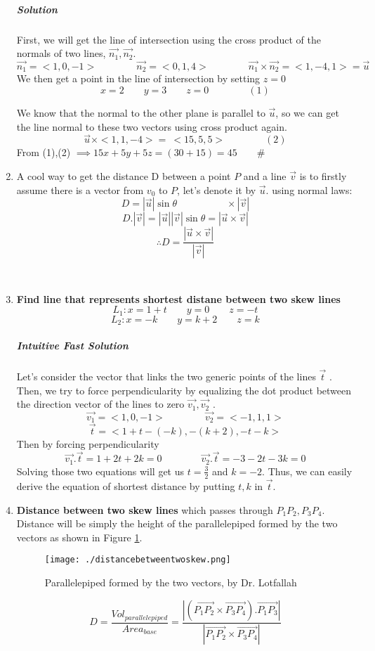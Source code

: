 \documentclass{article}
\begin{document}
\begin{enumerate}[1.]
			\subparagraph{Solution}
			First, we will get the line of intersection using the cross product of the normals of two lines, $ \vec{ n_1}, \vec{ n_2 } $.
			\[
				\vec{ n_1} = <1,0,-1> \qquad \qquad \vec{ n_2 } = <0,1,4> \qquad \qquad \vec{ n_1} \times  \vec{ n_2 } = <1,-4,1> = \vec{ u }
			\]
			We then get a point in the line of intersection by setting $z=0$
			\[
				x=2 \qquad y=3	\qquad z = 0	\qquad \qquad (1)
			\]

			We know that the normal to the other plane is parallel to $ \vec{ u } $, so we can get the line normal to these two vectors using cross product again.
			\[
				\vec{ u } \times <1,1,-4> =\ <15,5,5>	\qquad \qquad (2)
			\]
			From (1),(2) $ \implies 15x+5y+5z = (30+15)=45 \qquad \#
			$




		\item A cool way to get the distance D between a point $P$ and a line $ \vec{ v } $ is to firstly assume there is a vector from $ v_0 $ to $P$, let's denote it by $ \vec{ u } $. using normal laws: 
			\[
				D = | \vec{ u } | \sin{ \theta } \qquad \qquad  \quad \times | \vec{ v } |	
			\]
			\[
				D.| \vec{ v } | = | \vec{ u } | | \vec{ v } | \sin{ \theta } = | \vec{ u } \times \vec{ v } |
			\]
			\[
				\therefore D = \frac{| \vec{ u } \times \vec{ v } | }{ | \vec{ v } |  } 
			\]

			\

		\item \textbf{Find line that represents shortest distane  between two skew lines}
			\[
				L_1: x=1+t \qquad y=0 \qquad z = -t
			\]
			\[
				L_2: x=-k \qquad y=k+2 \qquad z = k
			\]
			\subparagraph{Intuitive Fast Solution}
			Let's consider the vector that links the two generic points of the lines $ \vec{ t } $ . Then, we try to force perpendicularity by equalizing the dot product between the direction vector of the lines to zero $ \vec{ v_1 }, \vec{ v_2 } $ .
			\[
				\vec{ v_1 } = <1,0,-1> \qquad \qquad \vec{ v_2 } = <-1,1,1>
			\]
			\[
				\vec{ t } = <1+t-(-k), -(k+2), -t-k>	
			\]
			Then by forcing perpendicularity
			\[
				\vec{ v_1 }. \vec{ t } = 1+2t+2k=0 \qquad \qquad \vec{ v_2 }. \vec{ t } =-3-2t-3k=0
			\]
			Solving those two equations will get us $t=\frac{3}{2}$ and $ k=-2 $. Thus, we can easily derive the equation of shortest distance by putting $t, k$ in $ \vec{ t } $.  

		\item \textbf{Distance between two skew lines} which passes through $ P_1P_2, P_3P_4 $.
			Distance will be simply the height of the parallelepiped formed by the two vectors as shown in Figure \ref{fig:-distancebetweentwoskew-png}.
			\begin{figure}[h!]
				\centering
				\texttt{[image: ./distancebetweentwoskew.png]}
				\caption{Parallelepiped formed by the two vectors, by Dr. Lotfallah}
				\label{fig:-distancebetweentwoskew-png}
			\end{figure}		
			\[
				D = \frac{ Vol_{parallelepiped} }{ Area_{base} } = \frac{ | ( \vec{ P_1P_2 } \times \vec{ P_3P_4 } ) . \vec{ P_1P_3 } |}{ | \vec{ P_1P_2 } \times  \vec{ P_3P_4 } | } 
			\]


\end{enumerate}
\end{document}
